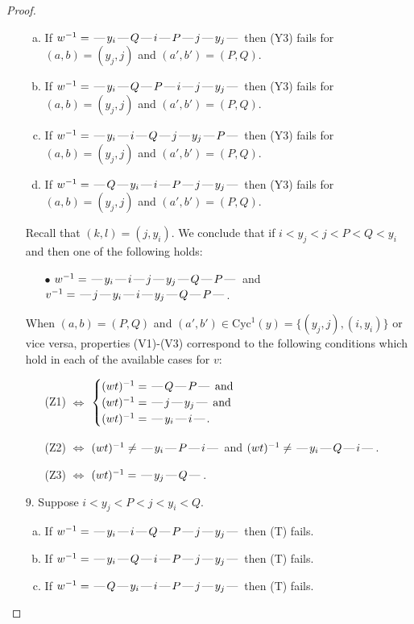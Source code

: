 \documentclass[10pt]{article}
\theoremstyle{definition}
\theoremstyle{definition}
\def\dash{\text{\hspace{0.5mm}---\hspace{0.5mm}}}
\def\Cyc{\mathrm{Cyc}}
\begin{document}
\begin{proof}
\begin{enumerate}
\begin{enumerate}[(a)]
\item If $w^{-1} = \dash y_i\dash Q\dash i\dash P\dash j\dash y_j\dash $ then (Y3) fails for $(a,b)=(y_j,j)$ and $(a',b')=(P,Q)$.
\item If $w^{-1} = \dash y_i\dash Q\dash P\dash i\dash j\dash y_j\dash $ then (Y3) fails for $(a,b)=(y_j,j)$ and $(a',b')=(P,Q)$.
\item If $w^{-1} = \dash y_i\dash i\dash Q\dash j\dash y_j\dash P\dash $ then (Y3) fails for $(a,b)=(y_j,j)$ and $(a',b')=(P,Q)$.
\item If $w^{-1} = \dash Q\dash y_i\dash i\dash P\dash j\dash y_j\dash $ then (Y3) fails for $(a,b)=(y_j,j)$ and $(a',b')=(P,Q)$.
\end{enumerate}
Recall that $(k,l) = (j,y_i)$.
We conclude that if $i < y_j < j < P < Q < y_i$ and then one of the following holds:
\begin{enumerate}
\item[$\bullet$] $w^{-1} = \dash y_i\dash i\dash j\dash y_j\dash Q\dash P\dash $ and $v^{-1} = \dash j\dash y_i\dash i\dash y_j\dash Q\dash P\dash $.
\end{enumerate}
When $(a,b)= (P,Q)$ and $(a',b')\in \Cyc^1(y)=\{(y_j,j),(i,y_i)\}$ or vice versa,
properties (V1)-(V3) correspond to the following conditions which hold in
each of the available cases for $v$:
\begin{enumerate}
\item[](Z1) $\Leftrightarrow$ $\begin{cases}\text{$(wt)^{-1} = \dash Q \dash P \dash$}\text{ and }\\
\text{$(wt)^{-1} = \dash j \dash y_j \dash$}\text{ and }\\
\text{$(wt)^{-1} = \dash y_i \dash i \dash$}.\end{cases}$
\item[](Z2) $\Leftrightarrow$ $(wt)^{-1} \neq \dash y_i \dash P \dash i \dash$ and $(wt)^{-1}\neq \dash y_i \dash Q \dash i \dash$.
\item[](Z3) $\Leftrightarrow$ $(wt)^{-1} = \dash y_j \dash Q \dash$.
\end{enumerate}
\item[$9$.] Suppose $i < y_j < P < j < y_i < Q$.
\begin{enumerate}[(a)]
\item If $w^{-1} = \dash y_i\dash i\dash Q\dash P\dash j\dash y_j\dash $ then (T) fails.
\item If $w^{-1} = \dash y_i\dash Q\dash i\dash P\dash j\dash y_j\dash $ then (T) fails.
\item If $w^{-1} = \dash Q\dash y_i\dash i\dash P\dash j\dash y_j\dash $ then (T) fails.

\end{enumerate}
\end{enumerate}
\end{proof}
\end{document}
